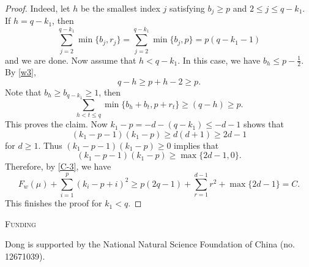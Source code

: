 \documentclass[11pt]{amsart}
\theoremstyle{plain}
\theoremstyle{definition}
\begin{document}
\begin{proof}
	Indeed, let $h$ be the smallest index $j$ satisfying $b_j\ge p$ and $2\le j\le q-k_1$. If $h=q-k_1$, then
	\[\sum_{j=2}^{q-k_1}\min\{b_j, r_j\}=\sum_{j=2}^{q-k_1}\min\{b_j,p\}=p(q-k_1-1)\]
	and we are done. Now assume that $h<q-k_1$. In this case, we have $b_h\le p-\frac{1}{2}$. By \eqref{w3},
	\[q-h\ge p+h-2\ge p.\]
	Note that $b_h\ge b_{q-k_1}\ge 1$, then
	\[\sum_{h<t\le q}\min\{b_h+b_t, p+r_t\}\ge (q-h)\ge p.\]
	This proves the claim. Now $k_1-p=-d-(q-k_1)\le -d-1$ shows that
	\[(k_1-p-1)(k_1-p)\ge d(d+1)\ge 2d-1\]
	for $d\ge 1$. Thus $(k_1-p-1)(k_1-p)\ge 0$ implies that
	\[(k_1-p-1)(k_1-p)\ge \max\{2d-1,0\}.\]
	Therefore, by \eqref{C-3}, we have
	\[F_w(\mu)+\sum_{i=1}^p(k_i-p+i)^2\ge p(2q-1)+\sum_{r=1}^{d-1}r^2+\max\{2d-1\}=C.\]
     This finishes the proof for $k_1<q$.
\end{proof}
\medskip

\centerline{\scshape Funding}
Dong is supported by the National Natural Science Foundation of China (no.
12671039).
\end{document}
